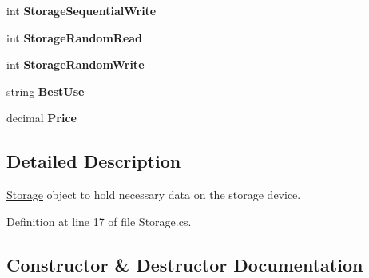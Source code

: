 \begin{DoxyCompactItemize}
\item 
int {\bfseries Storage\+Sequential\+Write}\hypertarget{class_business_objects_1_1_storage_a4a2935817a14037e969be09513959c08}{}\label{class_business_objects_1_1_storage_a4a2935817a14037e969be09513959c08}

\item 
int {\bfseries Storage\+Random\+Read}\hypertarget{class_business_objects_1_1_storage_a2bf2a6b46dca47a3a88f9270f3302c54}{}\label{class_business_objects_1_1_storage_a2bf2a6b46dca47a3a88f9270f3302c54}

\item 
int {\bfseries Storage\+Random\+Write}\hypertarget{class_business_objects_1_1_storage_ab68e1b1fbeff3388f2a251b96bad1e1b}{}\label{class_business_objects_1_1_storage_ab68e1b1fbeff3388f2a251b96bad1e1b}

\item 
string {\bfseries Best\+Use}\hypertarget{class_business_objects_1_1_storage_a44f2ddbf0dcb50030acadc574fc4b0eb}{}\label{class_business_objects_1_1_storage_a44f2ddbf0dcb50030acadc574fc4b0eb}

\item 
decimal {\bfseries Price}\hypertarget{class_business_objects_1_1_storage_acf3ae1fdd18c97a06f0a86744fe6e6fd}{}\label{class_business_objects_1_1_storage_acf3ae1fdd18c97a06f0a86744fe6e6fd}

\end{DoxyCompactItemize}


\subsection{Detailed Description}
\hyperlink{class_business_objects_1_1_storage}{Storage} object to hold necessary data on the storage device. 



Definition at line 17 of file Storage.\+cs.



\subsection{Constructor \& Destructor Documentation}
